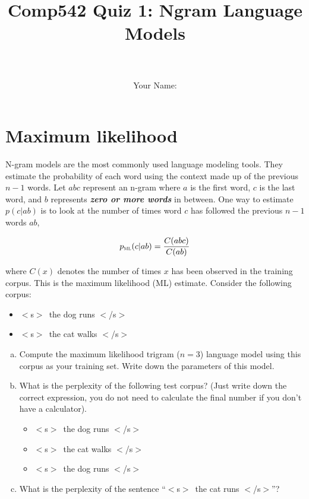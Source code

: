 \documentclass[a4paper]{article}
\title{Comp542 Quiz 1: Ngram Language Models}
\author{\\ \\Your Name: \underline{\hspace*{10cm}}}
\newcommand{\pml}{p_{\textsc{ml}}}
\newcommand{\sos}{$<$s$>$}
\newcommand{\eos}{$<$/s$>$}
\begin{document}
\maketitle
\newpage
\section{Maximum likelihood}

N-gram models are the most commonly used language modeling tools.
They estimate the probability of each word using the context made up
of the previous $n-1$ words.  Let $abc$ represent an n-gram where $a$
is the first word, $c$ is the last word, and $b$ represents {\bf {\em
    zero or more words}} in between.  One way to estimate $p(c|ab)$ is
to look at the number of times word $c$ has followed the previous
$n-1$ words $ab$,

\begin{equation}
\pml(c|ab) = \frac{C(abc)}{C(ab)}
\end{equation}

where $C(x)$ denotes the number of times $x$ has been
observed in the training corpus.  This is the maximum likelihood (ML)
estimate.  Consider the following corpus:

\begin{itemize}
\item \sos\ the dog runs \eos
\item \sos\ the cat walks \eos
\end{itemize}

\begin{enumerate}[(a)]
\item Compute the maximum likelihood trigram ($n=3$) language model
  using this corpus as your training set.  Write down the parameters
  of this model.
\vspace*{5cm}
\item What is the perplexity of the following test corpus?  (Just
  write down the correct expression, you do not need to calculate the
  final number if you don't have a calculator).
\begin{itemize}
\item \sos\ the dog runs \eos
\item \sos\ the cat walks \eos
\item \sos\ the dog runs \eos
\end{itemize}
\vspace*{5cm}
\item What is the perplexity of the sentence ``\sos\ the cat runs \eos''?
\end{enumerate}
\end{document}
